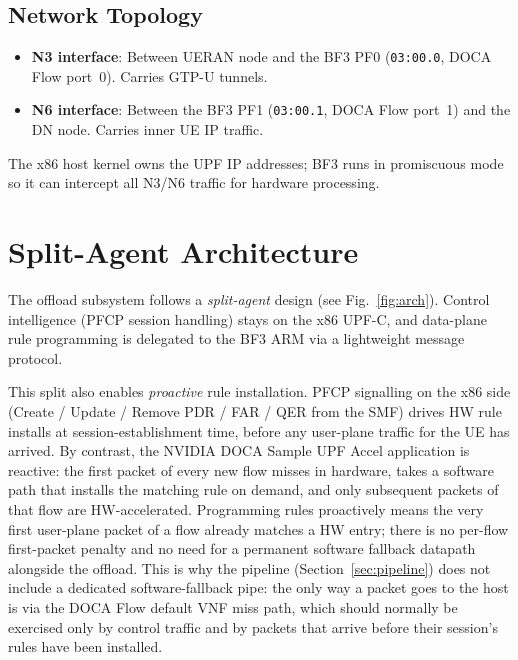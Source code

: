 \documentclass[conference]{IEEEtran}
\begin{document}
\subsection{Network Topology}

\begin{itemize}
  \item \textbf{N3 interface}: Between UERAN node and the BF3 PF0
        (\texttt{03:00.0}, DOCA Flow port~0).  Carries GTP-U tunnels.
  \item \textbf{N6 interface}: Between the BF3 PF1 (\texttt{03:00.1},
        DOCA Flow port~1) and the DN node.  Carries inner UE IP traffic.
\end{itemize}

The x86 host kernel owns the UPF IP addresses; BF3 runs in promiscuous mode
so it can intercept all N3/N6 traffic for hardware processing.

\section{Split-Agent Architecture}

The offload subsystem follows a \emph{split-agent} design (see
Fig.~\ref{fig:arch}).  Control intelligence (PFCP session handling)
stays on the x86 UPF-C, and data-plane rule programming is delegated
to the BF3 ARM via a lightweight message protocol.

This split also enables \emph{proactive} rule installation.  PFCP
signalling on the x86 side (Create / Update / Remove PDR / FAR / QER
from the SMF) drives HW rule installs at session-establishment time,
before any user-plane traffic for the UE has arrived.  By contrast,
the NVIDIA DOCA Sample UPF Accel application is reactive: the first
packet of every new flow misses in hardware, takes a software path
that installs the matching rule on demand, and only subsequent
packets of that flow are HW-accelerated.  Programming rules
proactively means the very first user-plane packet of a flow already
matches a HW entry; there is no per-flow first-packet penalty and no
need for a permanent software fallback datapath alongside the
offload.  This is why the pipeline (Section~\ref{sec:pipeline}) does
not include a dedicated software-fallback pipe: the only way a packet
goes to the host is via the DOCA Flow default VNF miss path, which
should normally be exercised only by control traffic and by packets
that arrive before their session's rules have been installed.
\end{document}
